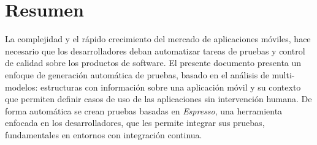 %
\chapter*{Resumen}
\label{sec:abstract}
\vspace*{-10mm}
La complejidad y el rápido crecimiento del mercado de aplicaciones móviles, hace necesario que los desarrolladores deban automatizar tareas de pruebas y control de calidad sobre los productos de software. El presente documento presenta un enfoque de generación automática de pruebas, basado en el análisis de multi-modelos: estructuras con información sobre una aplicación móvil y su contexto que permiten definir casos de uso de las aplicaciones sin intervención humana. De forma automática se crean pruebas basadas en \textit{Espresso}, una herramienta enfocada en los desarrolladores, que les permite integrar sus pruebas, fundamentales en entornos con integración continua.

\vspace*{20mm}

